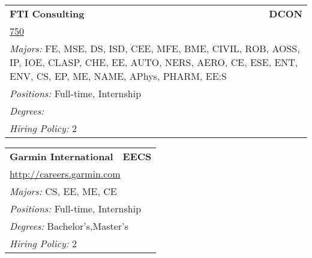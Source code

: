 \documentclass[twoside]{article}
\begin{document}
\begin{center}
\begin{multicols}{3}
\begin{FlushLeft}
\begin{minipage}{\columnwidth}
\end{minipage}
 
\begin{minipage}{\columnwidth}\begin{tabularx}{.95\columnwidth}{Xr}
                 {\Large\bf FTI Consulting} & {\Large\bf DCON}\\
    \multicolumn{2}{p{.95\columnwidth}}{\url{750}}\\
    \multicolumn{2}{p{.95\columnwidth}}{\emph{Majors:} FE, MSE, DS, ISD, CEE, MFE, BME, CIVIL, ROB, AOSS, IP, IOE, CLASP, CHE, EE, AUTO, NERS, AERO, CE, ESE, ENT, ENV, CS, EP, ME, NAME, APhys, PHARM, EE:S}\\
    \multicolumn{2}{p{.95\columnwidth}}{\emph{Positions:} Full-time, Internship}\\
    \multicolumn{2}{p{.95\columnwidth}}{\emph{Degrees:} }\\
    \multicolumn{2}{p{.95\columnwidth}}{\emph{Hiring Policy:} 2}\\
    \end{tabularx}
    
\end{minipage}
 
\begin{minipage}{\columnwidth}\begin{tabularx}{.95\columnwidth}{Xr}
                 {\Large\bf Garmin International} & {\Large\bf EECS}\\
    \multicolumn{2}{p{.95\columnwidth}}{\url{http://careers.garmin.com}}\\
    \multicolumn{2}{p{.95\columnwidth}}{\emph{Majors:} CS, EE, ME, CE}\\
    \multicolumn{2}{p{.95\columnwidth}}{\emph{Positions:} Full-time, Internship}\\
    \multicolumn{2}{p{.95\columnwidth}}{\emph{Degrees:} Bachelor's,Master's}\\
    \multicolumn{2}{p{.95\columnwidth}}{\emph{Hiring Policy:} 2}\\
    \end{tabularx}
    
\end{minipage}
 

\end{FlushLeft}
\end{multicols}
\end{center}
\end{document}
